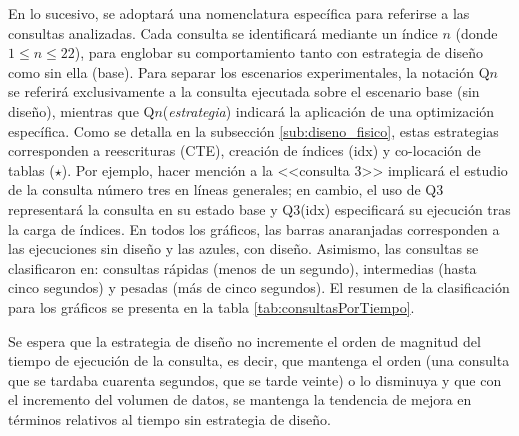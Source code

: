 \documentclass[12pt, letter paper]{report}
\begin{document}
        En lo sucesivo, se adoptará una nomenclatura específica para referirse a
        las consultas analizadas. Cada consulta se identificará mediante un
        índice $n$ (donde $1 \le n \le 22$), para englobar su comportamiento
        tanto con estrategia de diseño como sin ella (base). Para separar los
        escenarios experimentales, la notación Q$n$ se referirá exclusivamente
        a la consulta ejecutada sobre el escenario base (sin diseño), mientras
        que Q$n$(\textit{estrategia}) indicará la aplicación de una optimización
        específica. Como se detalla en la subsección \ref{sub:diseno_fisico},
        estas estrategias corresponden a reescrituras (CTE), creación de índices
        (idx) y co-locación de tablas ($\star$). Por ejemplo, hacer mención a la
        <<consulta 3>> implicará el estudio de la consulta número tres en líneas
        generales; en cambio, el uso de Q3 representará la consulta en su estado
        base y Q3(idx) especificará su ejecución tras la carga de índices. En
        todos los gráficos, las barras anaranjadas corresponden a las
        ejecuciones sin diseño y las azules, con diseño. Asimismo, las consultas
        se clasificaron en: consultas rápidas (menos de un segundo), intermedias
        (hasta cinco segundos) y pesadas (más de cinco segundos). El resumen de
        la clasificación para los gráficos se presenta en la tabla
        \ref{tab:consultasPorTiempo}.

        Se espera que la estrategia de diseño no incremente el orden de magnitud
        del tiempo de ejecución de la consulta, es decir, que mantenga el orden
        (una consulta que se tardaba cuarenta segundos, que se tarde veinte) o
        lo disminuya y que con el incremento del volumen de datos, se mantenga
        la tendencia de mejora en términos relativos al tiempo sin estrategia de
        diseño.
\end{document}
